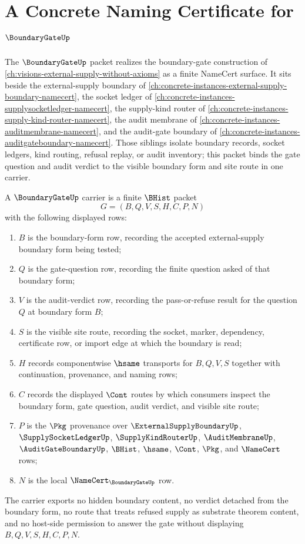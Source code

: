 \chapter{A Concrete Naming Certificate for $\BoundaryGateUp$}
\label{ch:concrete-instances-boundary-gate-namecert}

The $\BoundaryGateUp$ packet realizes the boundary-gate construction of \autoref{ch:visions-external-supply-without-axioms} as a finite NameCert surface. It sits beside the external-supply boundary of \autoref{ch:concrete-instances-external-supply-boundary-namecert}, the socket ledger of \autoref{ch:concrete-instances-supplysocketledger-namecert}, the supply-kind router of \autoref{ch:concrete-instances-supply-kind-router-namecert}, the audit membrane of \autoref{ch:concrete-instances-auditmembrane-namecert}, and the audit-gate boundary of \autoref{ch:concrete-instances-auditgateboundary-namecert}. Those siblings isolate boundary records, socket ledgers, kind routing, refusal replay, or audit inventory; this packet binds the gate question and audit verdict to the visible boundary form and site route in one carrier.

\begin{definition}
\label{def:boundary-gate-carrier}
A $\BoundaryGateUp$ carrier is a finite $\BHist$ packet
$$
G=(B,Q,V,S,H,C,P,N)
$$
with the following displayed rows:
\begin{enumerate}
\item $B$ is the boundary-form row, recording the accepted external-supply boundary form being tested;
\item $Q$ is the gate-question row, recording the finite question asked of that boundary form;
\item $V$ is the audit-verdict row, recording the pass-or-refuse result for the question $Q$ at boundary form $B$;
\item $S$ is the visible site route, recording the socket, marker, dependency, certificate row, or import edge at which the boundary is read;
\item $H$ records componentwise $\hsame$ transports for $B,Q,V,S$ together with continuation, provenance, and naming rows;
\item $C$ records the displayed $\Cont$ routes by which consumers inspect the boundary form, gate question, audit verdict, and visible site route;
\item $P$ is the $\Pkg$ provenance over $\ExternalSupplyBoundaryUp$, $\SupplySocketLedgerUp$, $\SupplyKindRouterUp$, $\AuditMembraneUp$, $\AuditGateBoundaryUp$, $\BHist$, $\hsame$, $\Cont$, $\Pkg$, and $\NameCert$ rows;
\item $N$ is the local $\NameCert_{\BoundaryGateUp}$ row.
\end{enumerate}
The carrier exports no hidden boundary content, no verdict detached from the boundary form, no route that treats refused supply as substrate theorem content, and no host-side permission to answer the gate without displaying $B,Q,V,S,H,C,P,N$.
\end{definition}

